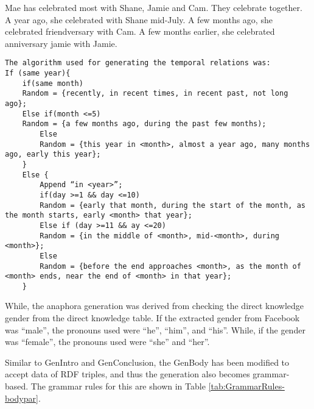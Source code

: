 \begin{center}Mae has celebrated most with Shane, Jamie and Cam. They celebrate together. A year ago, she celebrated with Shane mid-July. A few months ago, she celebrated friendversary with Cam. A few months earlier, she celebrated anniversary jamie with Jamie.\end{center}

\begin{lstlisting}
The algorithm used for generating the temporal relations was:
If (same year){
	if(same month)
	Random = {recently, in recent times, in recent past, not long ago};
	Else if(month <=5)
	Random = {a few months ago, during the past few months);
		Else
		Random = {this year in <month>, almost a year ago, many months ago, early this year};
	}
	Else {
		Append “in <year>”;
		if(day >=1 && day <=10)
		Random = {early that month, during the start of the month, as the month starts, early <month> that year};
		Else if (day >=11 && ay <=20)
		Random = {in the middle of <month>, mid-<month>, during <month>};
		Else 
		Random = {before the end approaches <month>, as the month of <month> ends, near the end of <month> in that year};
	}
	\end{lstlisting}

While, the anaphora generation was derived from checking the direct knowledge gender from the direct knowledge table. If the extracted gender from Facebook was ``male”, the pronouns used were ``he”, ``him”, and ``his”. While, if the gender was ``female”, the pronouns used were ``she” and ``her”.

Similar to GenIntro and GenConclusion, the GenBody has been modified to accept data of RDF triples, and thus the generation also becomes grammar-based. The grammar rules for this are shown in Table \ref{tab:GrammarRules-bodypar}.

